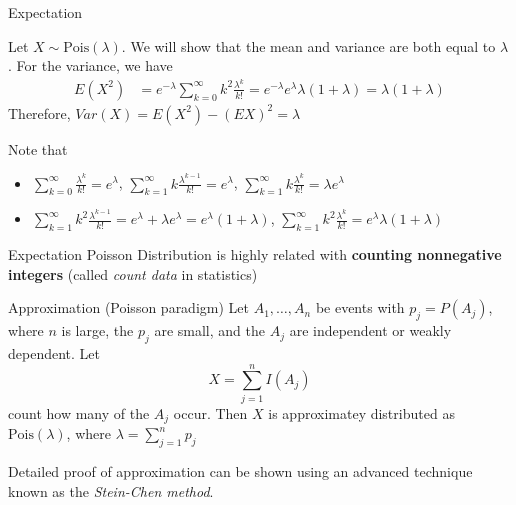 \documentclass[8pt]{beamer}
\newcommand{\pois}[1]{\text{Pois}(#1)}
\begin{document}
\begin{frame}{Expectation}
    \begin{example}
        Let $X \sim \text{Pois}(\lambda)$. We will show that the mean and variance are both equal to $\lambda$. For the variance, we have 
        \[
        \begin{aligned}
            E(X^2) &= e^{-\lambda} \sum^\infty_{k=0} k^2 \frac{\lambda^k}{k!}
            = e^{-\lambda} e^\lambda \lambda (1+\lambda) = \lambda (1+\lambda)
        \end{aligned}
        \]
        Therefore, $Var(X) = E(X^2) - (EX)^2 = \lambda$
    \end{example}

    Note that
    \begin{itemize}
        \item $\sum^\infty_{k=0}\frac{\lambda^k}{k!} = e^\lambda$, $\sum^\infty_{k=1} k \frac{\lambda^{k-1}}{k!}=e^\lambda$, $\sum^\infty_{k=1}k\frac{\lambda^k}{k!}=\lambda e^\lambda$
        \item $\sum^\infty_{k=1} k^2 \frac{\lambda^{k-1}}{k!}=e^\lambda + \lambda e^\lambda=e^\lambda (1 + \lambda)$, $\sum^\infty_{k=1} k^2 \frac{\lambda^k}{k!} = e^\lambda \lambda (1 + \lambda)$
    \end{itemize}
\end{frame}



\begin{frame}{Expectation}
    Poisson Distribution is highly related with \textbf{counting nonnegative integers} (called \textit{count data} in statistics)

    \begin{block}{Approximation (Poisson paradigm)}
        Let $A_1, \dots, A_n$ be events with $p_j = P(A_j)$, where $n$ is large, the $p_j$ are small, and the $A_j$ are independent or weakly dependent. Let
        $$X = \sum^n_{j=1}I(A_j)$$
        count how many of the $A_j$ occur. Then $X$ is approximatey distributed as $\pois{\lambda}$, where $\lambda = \sum^n_{j=1} p_j$
    \end{block}

    Detailed proof of approximation can be shown using an advanced technique known as the \textit{Stein-Chen method}.
\end{frame}
\end{document}
